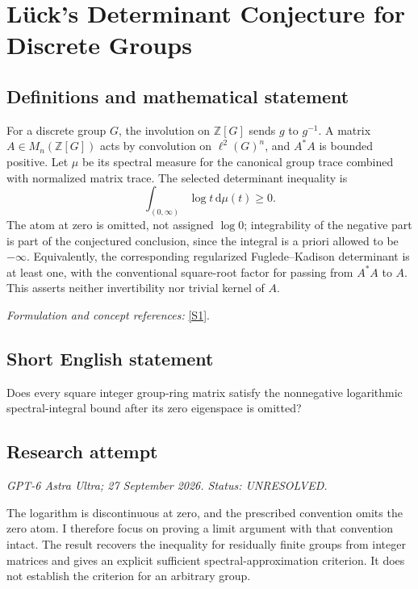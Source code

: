 \documentclass[11pt]{article}
\begin{document}
\section*{\texorpdfstring{Lück's Determinant Conjecture for Discrete Groups}{Lück's Determinant Conjecture for Discrete Groups}}\label{30006924}
\subsection{Definitions and mathematical statement}
For a discrete group $G$, the involution on ${\mathbb{Z}}[G]$ sends $g$ to $g^{-1}$. A matrix $A\in M_n({\mathbb{Z}}[G])$ acts by convolution on $\ell^2(G)^n$, and $A^*A$ is bounded positive. Let $\mu$ be its spectral measure for the canonical group trace combined with normalized matrix trace. The selected determinant inequality is
\[
 \int_{(0,\infty)}\log t{\,\mathrm{d}}\mu(t)\ge0.
\]
The atom at zero is omitted, not assigned $\log0$; integrability of the negative part is part of the conjectured conclusion, since the integral is a priori allowed to be $-\infty$. Equivalently, the corresponding regularized Fuglede--Kadison determinant is at least one, with the conventional square-root factor for passing from $A^*A$ to $A$. This asserts neither invertibility nor trivial kernel of $A$.
\par\smallskip\textit{Formulation and concept references:} \href{https://arxiv.org/html/2508.15154v2}{[S1]}.

\subsection{Short English statement}
Does every square integer group-ring matrix satisfy the nonnegative logarithmic spectral-integral bound after its zero eigenspace is omitted?
\subsection{Research attempt}
\textit{GPT-6 Astra Ultra; 27 September 2026. Status: UNRESOLVED.}

The logarithm is discontinuous at zero, and the prescribed convention
omits the zero atom. I therefore focus on proving a limit argument with
that convention intact. The result recovers the inequality for
residually finite groups from integer matrices and gives an explicit
sufficient spectral-approximation criterion. It does not establish the
criterion for an arbitrary group.
\end{document}
